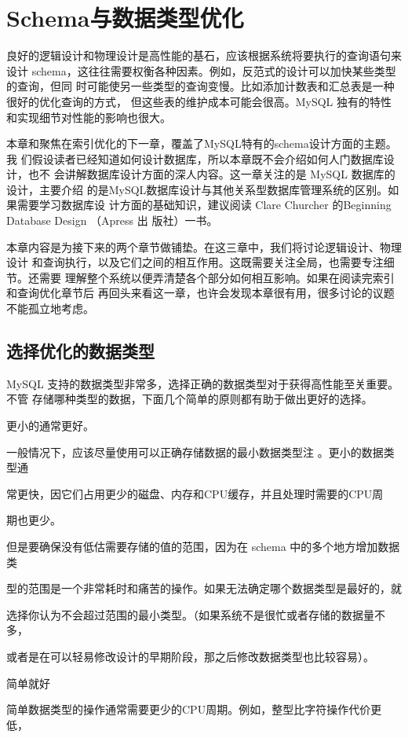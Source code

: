 \chapter{Schema与数据类型优化}
良好的逻辑设计和物理设计是高性能的基石，应该根据系统将要执行的查询语句来设计
schema，这往往需要权衡各种因素。例如，反范式的设计可以加快某些类型的查询，但同
时可能使另一些类型的查询变慢。比如添加计数表和汇总表是一种很好的优化查询的方式，
但这些表的维护成本可能会很高。MySQL 独有的特性和实现细节对性能的影响也很大。

本章和聚焦在索引优化的下一章，覆盖了MySQL特有的schema设计方面的主题。我
们假设读者已经知道如何设计数据库，所以本章既不会介绍如何人门数据库设计，也不
会讲解数据库设计方面的深人内容。这一章关注的是 MySQL 数据库的设计，主要介绍
的是MySQL数据库设计与其他关系型数据库管理系统的区别。如果需要学习数据库设
计方面的基础知识，建议阅读 Clare Churcher 的Beginning Database Design （Apress 出
版社）一书。

本章内容是为接下来的两个章节做铺垫。在这三章中，我们将讨论逻辑设计、物理设计
和查询执行，以及它们之间的相互作用。这既需要关注全局，也需要专注细节。还需要
理解整个系统以便弄清楚各个部分如何相互影响。如果在阅读完索引和查询优化章节后
再回头来看这一章，也许会发现本章很有用，很多讨论的议题不能孤立地考虑。

\section{选择优化的数据类型}
MySQL 支持的数据类型非常多，选择正确的数据类型对于获得高性能至关重要。不管
存储哪种类型的数据，下面几个简单的原则都有助于做出更好的选择。

更小的通常更好。

一般情况下，应该尽量使用可以正确存储数据的最小数据类型注 。更小的数据类型通

常更快，因它们占用更少的磁盘、内存和CPU缓存，并且处理时需要的CPU周

期也更少。

但是要确保没有低估需要存储的值的范围，因为在 schema 中的多个地方增加数据类

型的范围是一个非常耗时和痛苦的操作。如果无法确定哪个数据类型是最好的，就

选择你认为不会超过范围的最小类型。（如果系统不是很忙或者存储的数据量不多，

或者是在可以轻易修改设计的早期阶段，那之后修改数据类型也比较容易）。

简单就好

简单数据类型的操作通常需要更少的CPU周期。例如，整型比字符操作代价更低，


